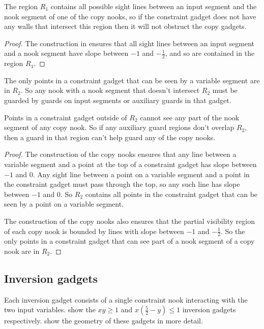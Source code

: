 \begin{lemma}\label{lem:Region1}
The region $R_1$ contains all possible sight lines between an input segment and the nook segment of one of the copy nooks, so if the constraint gadget does not have any walls that intersect this region then it will not obstruct the copy gadgets. 
\end{lemma}

\begin{proof}
The construction in  ensures that all sight lines between an input segment and a nook segment have slope between $-1$ and $-\frac12$, and so are contained in the region $R_1$.
\end{proof}

\begin{lemma}\label{lem:Region2}
The only points in a constraint gadget that can be seen by a variable segment are in $R_2$. So any nook with a nook segment that doesn't intersect $R_2$ must be guarded by guards on input segments or auxiliary guards in that gadget.

Points in a constraint gadget outside of $R_2$ cannot see any part of the nook segment of any copy nook. So if any auxiliary guard regions don't overlap $R_2$, then a guard in that region can't help guard any of the copy nooks. 
\end{lemma}

\begin{proof}
The construction of the copy nooks ensures that any line between a variable segment and a point at the top of a constraint gadget has slope between $-1$ and $0$. Any sight line between a point on a variable segment and a point in the constraint gadget must pass through the top, so any such line has slope between $-1$ and $0$. So $R_2$ contains all points in the constraint gadget that can be seen by a point on a variable segment.

The construction of the copy nooks also ensures that the partial visibility region of each copy nook is bounded by lines with slope between $-1$ and $-\frac12$. So the only points in a constraint gadget that can see part of a nook segment of a copy nook are in $R_2$.
\end{proof}

\subsection{Inversion gadgets}\label{sec:InversionVerification}

Each inversion gadget consists of a single constraint nook interacting with the two input variables.  show the $xy\ge 1$ and $x\left(\frac{5}2-y\right)\le 1$ inversion gadgets respectively.  show the geometry of these gadgets in more detail.

